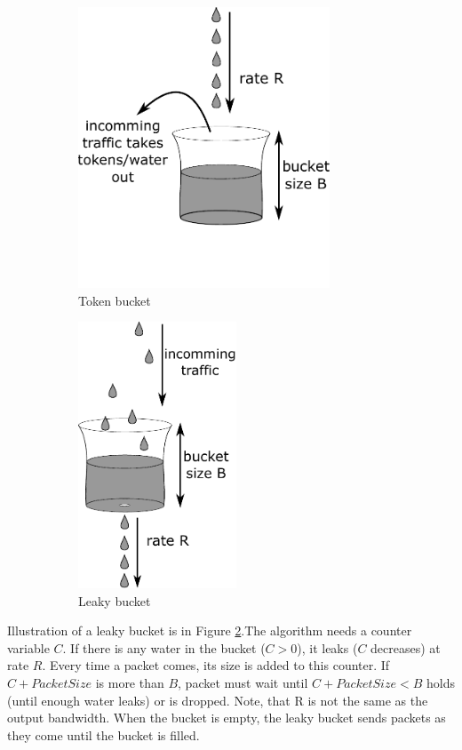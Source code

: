 \begin{figure}
	\centering
	\begin{subfigure}{.6\linewidth}
		\centering
		\includegraphics[width=75mm]{drawings/token_bucket}
		\caption{Token bucket}
		\label{fig08:token}
	\end{subfigure}%
	\begin{subfigure}{.4\linewidth}
		\centering
		\includegraphics[width=47mm]{drawings/leaky_bucket}
		\caption{Leaky bucket}
		\label{fig08:leaky}
	\end{subfigure}
	\caption{}
	\label{fig08:token_leaky}
\end{figure}

Illustration of a leaky bucket is in Figure \ref{fig08:leaky}.The algorithm needs a counter variable $C$. If there is any water in the bucket ($C > 0$), it leaks ($C$ decreases) at rate $R$. Every time a packet comes, its size is added to this counter. If $C + PacketSize$ is more than $B$, packet must wait until $C + PacketSize < B$ holds (until enough water leaks) or is dropped. Note, that R is not the same as the output bandwidth. When the bucket is empty, the leaky bucket sends packets as they come until the bucket is filled. 

